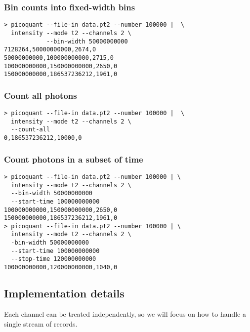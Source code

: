 \subsubsection{Bin counts into fixed-width bins}
\begin{verbatim}
> picoquant --file-in data.pt2 --number 100000 |  \
  intensity --mode t2 --channels 2 \
            --bin-width 50000000000
7128264,50000000000,2674,0
50000000000,100000000000,2715,0
100000000000,150000000000,2650,0
150000000000,186537236212,1961,0
\end{verbatim}

\subsubsection{Count all photons}
\begin{verbatim}
> picoquant --file-in data.pt2 --number 100000 |  \
  intensity --mode t2 --channels 2 \
  --count-all
0,186537236212,10000,0
\end{verbatim}

\subsubsection{Count photons in a subset of time}
\begin{verbatim}
> picoquant --file-in data.pt2 --number 100000 | \
  intensity --mode t2 --channels 2 \
  --bin-width 50000000000 
  --start-time 100000000000
100000000000,150000000000,2650,0
150000000000,186537236212,1961,0
> picoquant --file-in data.pt2 --number 100000 | \
  intensity --mode t2 --channels 2 \
  -bin-width 50000000000 
  --start-time 100000000000
  --stop-time 120000000000
100000000000,120000000000,1040,0
\end{verbatim}

\subsection{Implementation details}
\label{sec:intensity_implementation}
Each channel can be treated independently, so we will focus on how to handle a single stream of records. 

